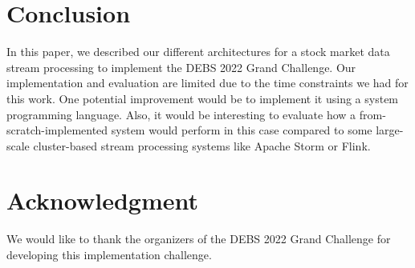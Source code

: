 \documentclass[sigconf]{acmart}
\begin{document}



\maketitle








\section{Conclusion}\label{sec:conclustion}
In this paper, we described our different architectures for a stock market data stream processing to implement the DEBS 2022 Grand Challenge. 
Our implementation and evaluation are limited due to the time constraints we had for this work. 
One potential improvement would be to implement it using a system programming language. 
Also, it would be interesting to evaluate how a from-scratch-implemented system would perform in this case 
compared to some large-scale cluster-based stream processing systems like Apache Storm or Flink.

\section{Acknowledgment}
We would like to thank the organizers of the DEBS 2022 Grand Challenge for developing this implementation challenge.




\end{document}
